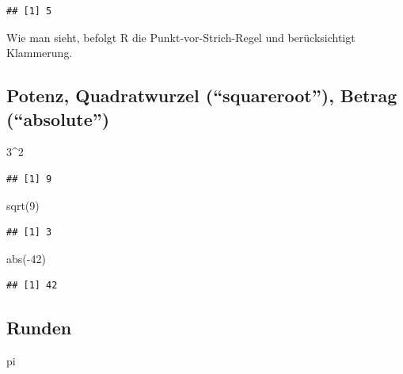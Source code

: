 \documentclass[
]{book}
\newenvironment{Shaded}{\begin{snugshade}}{\end{snugshade}}
\newcommand{\DecValTok}[1]{\textcolor[rgb]{0.00,0.00,0.81}{#1}}
\newcommand{\FunctionTok}[1]{\textcolor[rgb]{0.00,0.00,0.00}{#1}}
\newcommand{\NormalTok}[1]{#1}
\newcommand{\SpecialCharTok}[1]{\textcolor[rgb]{0.00,0.00,0.00}{#1}}
\begin{document}
\begin{verbatim}
## [1] 5
\end{verbatim}

Wie man sieht, befolgt R die Punkt-vor-Strich-Regel und berücksichtigt Klammerung.

\hypertarget{potenz-quadratwurzel-squareroot-betrag-absolute}{%
\subsection*{Potenz, Quadratwurzel (``squareroot''), Betrag (``absolute'')}\label{potenz-quadratwurzel-squareroot-betrag-absolute}}

\begin{Shaded}
\begin{Highlighting}[]
\DecValTok{3}\SpecialCharTok{\^{}}\DecValTok{2}
\end{Highlighting}
\end{Shaded}

\begin{verbatim}
## [1] 9
\end{verbatim}

\begin{Shaded}
\begin{Highlighting}[]
\FunctionTok{sqrt}\NormalTok{(}\DecValTok{9}\NormalTok{)}
\end{Highlighting}
\end{Shaded}

\begin{verbatim}
## [1] 3
\end{verbatim}

\begin{Shaded}
\begin{Highlighting}[]
\FunctionTok{abs}\NormalTok{(}\SpecialCharTok{{-}}\DecValTok{42}\NormalTok{)}
\end{Highlighting}
\end{Shaded}

\begin{verbatim}
## [1] 42
\end{verbatim}

\hypertarget{runden}{%
\subsection*{Runden}\label{runden}}

\begin{Shaded}
\begin{Highlighting}[]
\NormalTok{pi}
\end{Highlighting}
\end{Shaded}
\end{document}
